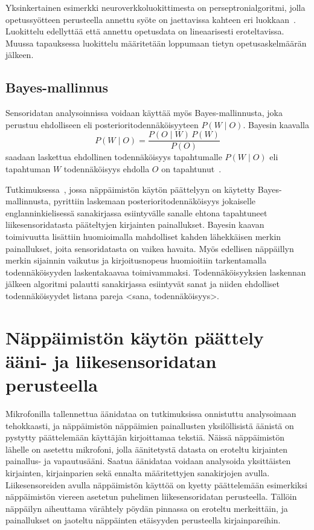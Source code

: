 \documentclass[finnish]{tktltiki2}
\theoremstyle{definition}
\theoremstyle{remark}
\begin{document}
Yksinkertainen esimerkki neuroverkkoluokittimesta on perseptronialgoritmi, jolla opetussyötteen perusteella annettu syöte on jaettavissa kahteen eri luokkaan~\cite{ert}. Luokittelu edellyttää että annettu opetusdata on lineaarisesti eroteltavissa. Muussa tapauksessa luokittelu määritetään loppumaan tietyn opetusaskelmäärän jälkeen.


\subsection{Bayes-mallinnus}
Sensoridatan analysoinnissa voidaan käyttää myös Bayes-mallinnusta, joka perustuu ehdolliseen eli posterioritodennäköisyyteen $ P(W \mid O)$. Bayesin kaavalla $$ P(W \mid O) = \frac{P(O \mid W) \, P(W)}{P(O)} $$ saadaan laskettua ehdollinen todennäköisyys tapahtumalle $ P(W \mid O)$ eli tapahtuman $W$ todennäköisyys ehdolla $O$ on tapahtunut~\cite{bar}.

Tutkimuksessa~\cite{mole}, jossa näppäimistön käytön päättelyyn on käytetty Bayes-mallinnusta, pyrittiin laskemaan posterioritodennäköisyys jokaiselle englanninkielisessä sanakirjassa esiintyvälle sanalle ehtona tapahtuneet liikesensoridatasta pääteltyjen kirjainten painallukset. Bayesin kaavan toimivuutta lisättiin huomioimalla mahdolliset kahden lähekkäisen merkin painallukset, joita sensoridatasta on vaikea havaita. Myös edellisen näppäillyn merkin sijainnin vaikutus ja kirjoitusnopeus huomioitiin tarkentamalla todennäköisyyden laskentakaavaa toimivammaksi. Todennäköisyyksien laskennan jälkeen algoritmi palautti sanakirjassa esiintyvät sanat ja niiden ehdolliset todennäköisyydet listana pareja <sana, todennäköisyys>.


\section{Näppäimistön käytön päättely ääni- ja liikesensoridatan perusteella}
Mikrofonilla tallennettua äänidataa on tutkimuksissa onnistuttu analysoimaan tehokkaasti, ja näppäimistön näppäimien painallusten yksilöllisistä äänistä on pystytty päättelemään käyttäjän kirjoittamaa tekstiä. Näissä näppäimistön lähelle on asetettu mikrofoni, jolla äänitetystä datasta on eroteltu kirjainten painallus- ja vapautusääni. Saatua äänidataa voidaan analysoida yksittäisten kirjainten, kirjainparien sekä ennalta määritettyjen sanakirjojen avulla. 
Liikesensoreiden avulla näppäimistön käyttöä on kyetty päättelemään esimerkiksi näppäimistön viereen asetetun puhelimen liikesensoridatan perusteella. Tällöin näppäilyn aiheuttama värähtely pöydän pinnassa on eroteltu merkeittäin, ja painallukset on jaoteltu näppäinten etäisyyden perusteella kirjainpareihin.
\end{document}
